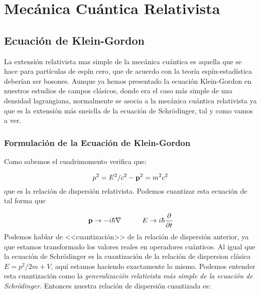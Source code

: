 \chapter{Mecánica Cuántica Relativista}



\section{Ecuación de Klein-Gordon}

La extensión relativista mas simple de la mecánica cuántica es aquella que se hace para partículas de espín cero, que de acuerdo con la teoría espín-estadística deberían ser bosones. Aunque ya hemos presentado la ecuación Klein-Gordon en nuestros estudios de campos clásicos, donde era el caso más simple de una densidad lagrangiana, normalmente se asocia a la mecánica cuántica relativista ya que es la extensión más sneiclla de la ecuación de Schrödinger, tal y como vamos a ver.

\subsection{Formulación de la Ecuación de Klein-Gordon}

Como sabemos el cuadrimomento verifica que:

\begin{equation}
	p^2 = E^2/c^2 - \mathbf{p}^2 = m^2 c^2 
\end{equation}
que es la relación de dispersión relativista. Podemos cuantizar esta ecuación de tal forma que 

\begin{equation}
	\mathbf{p} \rightarrow -i \hbar \nabla \quad \quad \quad E \rightarrow i \hbar \frac{\partial }{\partial t}
\end{equation}
Podemos hablar de <<cuantización>> de la relación de dispersión anterior, ya que estamos transformado los valores reales en operadores cuánticos. Al igual que la ecuación de Schrödinger es la cuantización de la relación de dispersion clásica $E=p^2/2m+V$, aquí estamos haciendo exactamente lo mismo. Podemos entender esta cuantización como la \textit{generalización relativista más simple de la ecuación de Schrödinger}. Entonces nuestra relación de dispersión cuantizada es:

